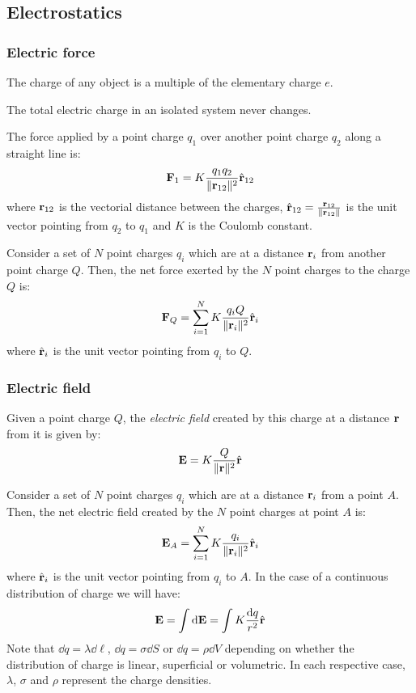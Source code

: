 \documentclass[../../../main.tex]{subfiles}
\begin{document}
\begin{multicols}{2}
  \subsection{Electrostatics}
  \subsubsection*{Electric force}
  \begin{prop}
    The charge of any object is a multiple of the elementary charge $e$.
  \end{prop}
  \begin{law}
    The total electric charge in an isolated system never changes.
  \end{law}
  \begin{law}
    The force applied by a point charge $q_1$ over another point charge $q_2$ along a straight line is:
    $$\vb{F}_1=K\frac{q_1q_2}{\|\vb{r}_{12}\|^2}\hat{\vb{r}}_{12}$$
    where $\vb{r}_{12}$ is the vectorial distance between the charges, $\hat{\vb{r}}_{12}=\frac{\vb{r}_{12}}{\|\vb{r}_{12}\|}$ is the unit vector pointing from $q_2$ to $q_1$ and $K$ is the Coulomb constant.
  \end{law}
  \begin{principle}
    Consider a set of $N$ point charges $q_i$ which are at a distance $\vb{r}_i$ from another point charge $Q$. Then, the net force exerted by the $N$ point charges to the charge $Q$ is:
    $$\vb{F}_Q=\sum_{i=1}^NK\frac{q_iQ}{\|\vb{r}_{i}\|^2}\hat{\vb{r}}_{i}$$ where $\hat{\vb{r}}_{i}$ is the unit vector pointing from $q_i$ to $Q$.
  \end{principle}
  \subsubsection*{Electric field}
  \begin{definition}
    Given a point charge $Q$, the \textit{electric field} created by this charge at a distance $\vb{r}$ from it is given by:
    $$\vb{E}=K\frac{Q}{\|\vb{r}\|^2}\hat{\vb{r}}$$
  \end{definition}
  \begin{principle}
    Consider a set of $N$ point charges $q_i$ which are at a distance $\vb{r}_i$ from a point $A$. Then, the net electric field created by the $N$ point charges at point $A$ is:
    $$\vb{E}_A=\sum_{i=1}^NK\frac{q_i}{\|\vb{r}_{i}\|^2}\hat{\vb{r}}_{i}$$ where $\hat{\vb{r}}_{i}$ is the unit vector pointing from $q_i$ to $A$. In the case of a continuous distribution of charge we will have:
    $$\vb{E}=\int\dd\vb{E}=\int K\frac{\dd q}{r^2}\hat{\vb{r}}$$
    Note that $\dd q=\lambda\dd \ell$, $\dd q=\sigma\dd S$ or $\dd q=\rho\dd V$ depending on whether the distribution of charge is linear, superficial or volumetric. In each respective case, $\lambda$, $\sigma$ and $\rho$ represent the charge densities.
  \end{principle}

\end{multicols}
\end{document}
